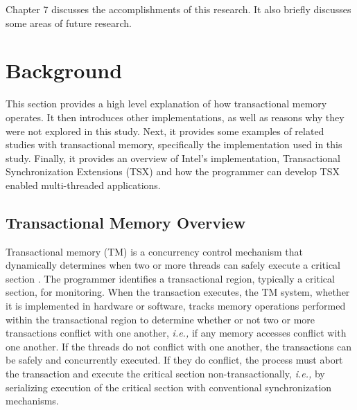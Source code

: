 \documentclass[11pt]{book}
\begin{document}
Chapter 7 discusses the accomplishments of this research.  It also briefly discusses some
areas of future research.


\chapter{Background}

This section provides a high level explanation of how transactional memory operates.  It
then introduces other implementations, as well as reasons why they were not explored in
this study.  Next, it provides some examples of related studies with transactional memory,
specifically the implementation used in this study.  Finally, it provides an overview of
Intel's implementation, Transactional Synchronization Extensions (TSX) and how the
programmer can develop TSX enabled multi-threaded applications.

\section{Transactional Memory Overview}


Transactional memory (TM) is a concurrency control mechanism that dynamically
determines when two or more threads can safely execute a critical section
\cite{sle_rajwar}.  The programmer identifies a transactional region, typically
a critical section, for monitoring.  When the transaction executes, the TM
system, whether it is implemented in hardware or software, tracks memory
operations performed within the transactional region to determine whether or not
two or more transactions conflict with one another, \emph{i.e.,} if any memory
accesses conflict with one another.  If the threads do not conflict with one
another, the transactions can be safely and concurrently executed.  If they do
conflict, the process must abort the transaction and execute the critical
section non-transactionally, \emph{i.e.,} by serializing execution of the
critical section with conventional synchronization mechanisms.
\end{document}
